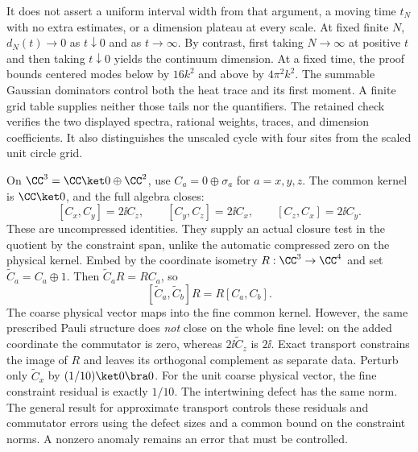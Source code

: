 It does not assert a uniform interval width from that argument, a moving time $t_N$ with no extra estimates, or a dimension plateau at every scale. At fixed finite $N$, $d_N(t)\to0$ as $t\downarrow0$ and as $t\to\infty$. By contrast, first taking $N\to\infty$ at positive $t$ and then taking $t\downarrow0$ yields the continuum dimension.
At a fixed time, the proof bounds centered modes below by $16k^2$ and above by $4\pi^2k^2$. The summable Gaussian dominators control both the heat trace and its first moment. A finite grid table supplies neither those tails nor the quantifiers. The retained check verifies the two displayed spectra, rational weights, traces, and dimension coefficients. It also distinguishes the unscaled cycle with four sites from the scaled unit circle grid.

On $\CC^3=\CC\ket0\oplus\CC^2$, use $C_a=0\oplus\sigma_a$ for $a=x,y,z$. The common kernel is $\CC\ket0$, and the full algebra closes:
\[
[C_x,C_y]=2\ii C_z,\qquad[C_y,C_z]=2\ii C_x,\qquad[C_z,C_x]=2\ii C_y.
\]
These are uncompressed identities. They supply an actual closure test in the quotient by the constraint span, unlike the automatic compressed zero on the physical kernel.
Embed by the coordinate isometry $R:\CC^3\to\CC^4$ and set $\widetilde C_a=C_a\oplus1$. Then $\widetilde C_aR=RC_a$, so
\[
[\widetilde C_a,\widetilde C_b]R=R[C_a,C_b].
\]
The coarse physical vector maps into the fine common kernel. However, the same prescribed Pauli structure does \emph{not} close on the whole fine level: on the added coordinate the commutator is zero, whereas $2\ii\widetilde C_z$ is $2\ii$. Exact transport constrains the image of $R$ and leaves its orthogonal complement as separate data.
Perturb only $\widetilde C_x$ by $(1/10)\ket0\bra0$. For the unit coarse physical vector, the fine constraint residual is exactly $1/10$. The intertwining defect has the same norm. The general result for approximate transport controls these residuals and commutator errors using the defect sizes and a common bound on the constraint norms. A nonzero anomaly remains an error that must be controlled.


